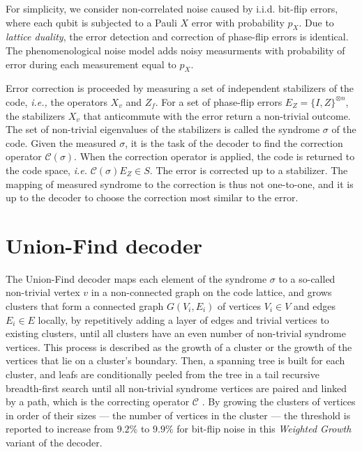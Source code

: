 For simplicity, we consider non-correlated noise caused by i.i.d. bit-flip errors, where each qubit is subjected to a Pauli $X$ error with probability $p_X$. Due to \emph{lattice duality}, the error detection and correction of phase-flip errors is identical. The phenomenological noise model adds noisy measurments with probability of error during each measurement equal to $p_X$. 

Error correction is proceeded by measuring a set of independent stabilizers of the code, \emph{i.e.,} the operators $X_v$ and $Z_f$. For a set of phase-flip errors $E_Z = \{I,Z\}^{\otimes n}$, the stabilizers $X_v$ that anticommute with the error return a non-trivial outcome. The set of non-trivial eigenvalues of the stabilizers is called the syndrome $\sigma$ of the code. Given the measured $\sigma$, it is the task of the decoder to find the correction operator $\mathcal{C}(\sigma)$. When the correction operator is applied, the code is returned to the code space, \emph{i.e.} $\mathcal{C}(\sigma)E_Z \in S$. The error is corrected up to a stabilizer. The mapping of measured syndrome to the correction is thus not one-to-one, and it is up to the decoder to choose the correction most similar to the error. 

\section{Union-Find decoder}\label{sec:unionfind}

The Union-Find decoder \cite{delfosse2017almost} maps each element of the syndrome $\sigma$ to a so-called non-trivial vertex $v$ in a non-connected graph on the code lattice, and grows clusters that form a connected graph $G(V_i, E_i)$ of vertices $V_i\in V$ and edges $E_i \in E$ locally, by repetitively adding a layer of edges and trivial vertices to existing clusters, until all clusters have an even number of non-trivial syndrome vertices. This process is described as the growth of a cluster or the growth of the vertices that lie on a cluster's boundary. Then, a spanning tree is built for each cluster, and leafs are conditionally peeled from the tree in a tail recursive breadth-first search until all non-trivial syndrome vertices are paired and linked by a path, which is the correcting operator $\mathcal{C}$ \cite{delfosse2017linear}. By growing the clusters of vertices in order of their sizes --- the number of vertices in the cluster --- the threshold is reported to increase from $9.2\%$ to $9.9\%$ for bit-flip noise in this \emph{Weighted Growth} variant of the decoder.

